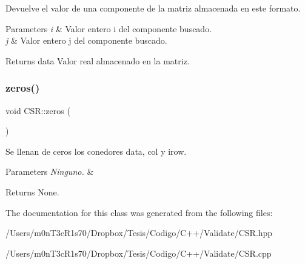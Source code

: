 Devuelve el valor de una componente de la matriz almacenada en este formato. 


\begin{DoxyParams}{Parameters}
{\em i} & Valor entero i del componente buscado. \\
\hline
{\em j} & Valor entero j del componente buscado. \\
\hline
\end{DoxyParams}
\begin{DoxyReturn}{Returns}
data Valor real almacenado en la matriz. 
\end{DoxyReturn}
\hypertarget{class_c_s_r_aeee0524514c9365bd324676e769cb869}{}\label{class_c_s_r_aeee0524514c9365bd324676e769cb869} 
\subsubsection{\texorpdfstring{zeros()}{zeros()}}
{\footnotesize\ttfamily void C\+S\+R\+::zeros (\begin{DoxyParamCaption}{ }\end{DoxyParamCaption})}



Se llenan de ceros los conedores data, col y irow. 


\begin{DoxyParams}{Parameters}
{\em Ninguno.} & \\
\hline
\end{DoxyParams}
\begin{DoxyReturn}{Returns}
None. 
\end{DoxyReturn}


The documentation for this class was generated from the following files\+:\begin{DoxyCompactItemize}
\item 
/\+Users/m0n\+T3c\+R1s70/\+Dropbox/\+Tesis/\+Codigo/\+C++/\+Validate/C\+S\+R.\+hpp\item 
/\+Users/m0n\+T3c\+R1s70/\+Dropbox/\+Tesis/\+Codigo/\+C++/\+Validate/C\+S\+R.\+cpp\end{DoxyCompactItemize}
